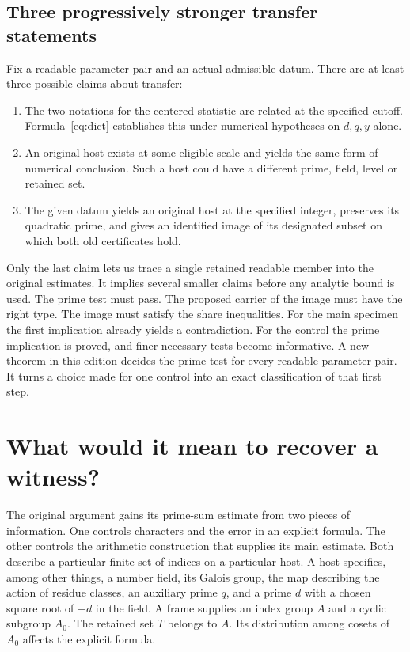 \documentclass[12pt,letterpaper]{article}
\begin{document}
\subsection{Three progressively stronger transfer statements}
Fix a readable parameter pair and an actual admissible datum. There are at least three possible claims about transfer:
\begin{enumerate}
\item The two notations for the centered statistic are related at the specified cutoff. Formula~\eqref{eq:dict} establishes this under numerical hypotheses on $d,q,y$ alone.
\item An original host exists at some eligible scale and yields the same form of numerical conclusion. Such a host could have a different prime, field, level or retained set.
\item The given datum yields an original host at the specified integer, preserves its quadratic prime, and gives an identified image of its designated subset on which both old certificates hold.
\end{enumerate}
Only the last claim lets us trace a single retained readable member into the original estimates. It implies several smaller claims before any analytic bound is used. The prime test must pass. The proposed carrier of the image must have the right type. The image must satisfy the share inequalities. For the main specimen the first implication already yields a contradiction. For the control the prime implication is proved, and finer necessary tests become informative. A new theorem in this edition decides the prime test for every readable parameter pair. It turns a choice made for one control into an exact classification of that first step.

\section{What would it mean to recover a witness?}
The original argument gains its prime-sum estimate from two pieces of information. One controls characters and the error in an explicit formula. The other controls the arithmetic construction that supplies its main estimate. Both describe a particular finite set of indices on a particular host. A host specifies, among other things, a number field, its Galois group, the map describing the action of residue classes, an auxiliary prime $q$, and a prime $d$ with a chosen square root of $-d$ in the field. A frame supplies an index group $A$ and a cyclic subgroup $A_0$. The retained set $T$ belongs to $A$. Its distribution among cosets of $A_0$ affects the explicit formula.
\end{document}
